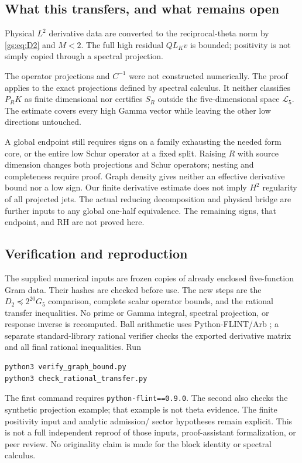 \documentclass[11pt,a4paper]{article}
\numberwithin{equation}{section}
\theoremstyle{definition}\newtheorem{definition}[theorem]{Definition}
\theoremstyle{remark}\newtheorem{remark}[theorem]{Remark}
\begin{document}
\subsection{What this transfers, and what remains open}
Physical $L^2$ derivative data are converted to the reciprocal-theta norm
by \eqref{gs:eq:D2} and $M<2$. The full high residual $QL_Kv$ is bounded;
positivity is not simply copied through a spectral projection.

The operator projections and $C^{-1}$ were not constructed numerically.
The proof applies to the exact projections defined by spectral calculus.
It neither classifies $P_RK$ as finite dimensional nor certifies
$S_R$ outside the five-dimensional space $\mathcal L_5$.
The estimate covers every high Gamma vector while leaving the other low
directions untouched.

A global endpoint still requires signs on a family exhausting the needed
form core, or the entire low Schur operator at a fixed split. Raising
$R$ with source dimension changes both projections and Schur operators;
nesting and completeness require proof. Graph density gives neither an
effective derivative bound nor a low sign. Our finite derivative estimate
does not imply $H^2$ regularity of all projected jets. The actual reducing
decomposition and physical bridge are further inputs to any global
one-half equivalence. The remaining signs, that endpoint, and RH are
not proved here.

\subsection{Verification and reproduction}
The supplied numerical inputs are frozen copies of already enclosed
five-function Gram data. Their hashes are checked before use. The new
steps are the $D_2\preceq2^{20}G_5$ comparison, complete scalar operator
bounds, and the rational transfer inequalities. No prime or Gamma
integral, spectral projection, or response inverse is recomputed.
Ball arithmetic uses Python-FLINT/Arb \cite{fzArbIntegration}; a separate
standard-library rational verifier checks the exported derivative matrix
and all final rational inequalities. Run
\begin{verbatim}
python3 verify_graph_bound.py
python3 check_rational_transfer.py
\end{verbatim}
The first command requires \texttt{python-flint==0.9.0}. The second
also checks the synthetic projection example; that example is not
theta evidence. The finite positivity input and analytic admission/
sector hypotheses remain explicit. This is not a full independent
reproof of those inputs, proof-assistant formalization, or peer review.
No originality claim is made for the block identity or spectral calculus.
\end{document}
